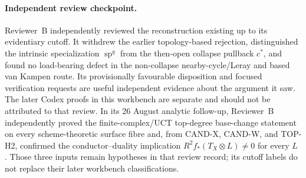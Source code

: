 \paragraph{Independent review checkpoint.}
Reviewer~B independently reviewed the reconstruction existing up to its
evidentiary cutoff.  It withdrew the earlier topology-based rejection,
distinguished the intrinsic specialization \(\operatorname{sp}^q\) from the
then-open collapse pullback \(c^*\), and found no load-bearing defect in the
non-collapse nearby-cycle/Leray and based van Kampen route.  Its
provisionally favourable disposition and focused verification requests are
useful independent evidence about the argument it saw.  The later Codex
proofs in this workbench are separate and should not be attributed to that
review.  In its 26 August analytic follow-up, Reviewer~B independently proved
the finite-complex/UCT top-degree base-change statement on every
scheme-theoretic surface fibre and, from CAND-X, CAND-W, and TOP-H2, confirmed
the conductor--duality implication
$R^2f_*(T_X\otimes L)\ne0$ for every $L$ \cite{ReviewerBValidation2026}.
Those three inputs remain hypotheses in that review record; its cutoff labels
do not replace their later workbench classifications.

